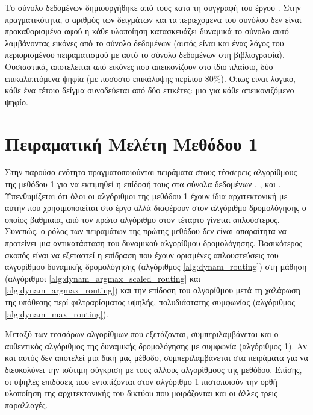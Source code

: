     Το σύνολο δεδομένων  δημιουργήθηκε από τους  κατα τη συγγραφή του έργου \cite{sabour2017dynamic}. Στην πραγματικότητα, ο αριθμός των δειγμάτων και τα περιεχόμενα του συνόλου δεν είναι προκαθορισμένα αφού η κάθε υλοποίηση κατασκευάζει δυναμικά το σύνολο αυτό λαμβάνοντας εικόνες από το σύνολο δεδομένων  (αυτός είναι και ένας λόγος του περιορισμένου πειραματισμού με αυτό το σύνολο δεδομένων στη βιβλιογραφία). Ουσιαστικά, αποτελείται από εικόνες που απεικονίζουν στο ίδιο πλαίσιο, δύο επικαλυπτόμενα ψηφία (με ποσοστό επικάλυψης περίπου 80\%). Όπως είναι λογικό, κάθε ένα τέτοιο δείγμα συνοδεύεται από δύο ετικέτες: μια για κάθε απεικονιζόμενο ψηφίο.
    

\section{Πειραματική Μελέτη Μεθόδου 1}

Στην παρούσα ενότητα πραγματοποιούνται πειράματα στους τέσσερεις αλγορίθμους της μεθόδου 1 για να εκτιμηθεί η επίδοσή τους στα σύνολα δεδομένων \cite{deng2012mnist}, \cite{Xiao2017FashionMNISTAN}, \cite{CIFAR10} και \cite{lecun2004learning}. Υπενθυμίζεται ότι όλοι οι αλγόριθμοι της μεθόδου 1 έχουν ίδια αρχιτεκτονική με αυτήν που χρησιμοποιείται στο έργο \cite{sabour2017dynamic} αλλά διαφέρουν στον αλγόριθμο δρομολόγησης ο οποίος βαθμιαία, από τον πρώτο αλγόριθμο στον τέταρτο γίνεται απλούστερος. Συνεπώς, ο ρόλος των πειραμάτων της πρώτης μεθόδου δεν είναι απαραίτητα να προτείνει μια αντικατάσταση του δυναμικού αλγορίθμου δρομολόγησης. Βασικότερος σκοπός είναι να εξεταστεί η επίδραση που έχουν ορισμένες απλουστεύσεις του αλγορίθμου δυναμικής δρομολόγησης (αλγόριθμος \ref{alg:dynam_routing}) στη μάθηση (αλγόριθμοι \ref{alg:dynam_argmax_scaled_routing} και \ref{alg:dynam_argmax_routing}) και την επίδοση του αλγορίθμου μετά τη χαλάρωση της υπόθεσης περί φιλτραρίσματος υψηλής, πολυδιάστατης συμφωνίας (αλγόριθμος \ref{alg:dynam_max_routing}).\par

Μεταξύ των τεσσάρων αλγορίθμων που εξετάζονται, συμπεριλαμβάνεται και ο αυθεντικός αλγόριθμος της δυναμικής δρομολόγησης με συμφωνία (αλγόριθμος 1). Αν και αυτός δεν αποτελεί μια δική μας μέθοδο, συμπεριλαμβάνεται στα πειράματα για να διευκολύνει την ισότιμη σύγκριση με τους άλλους αλγορίθμους της μεθόδου. Επίσης, οι υψηλές επιδόσεις που εντοπίζονται στον αλγόριθμο 1 πιστοποιούν την ορθή υλοποίηση της αρχιτεκτονικής του δικτύου που μοιράζονται και οι άλλες τρεις παραλλαγές.\par

